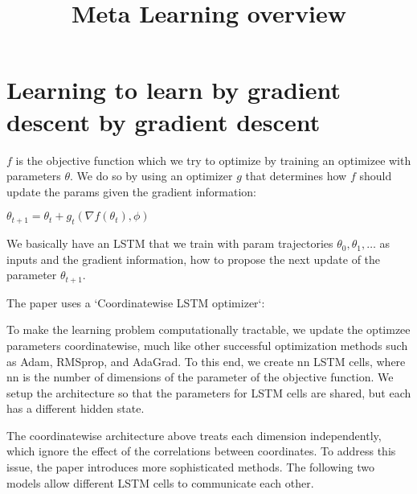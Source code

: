 \documentclass{article}
\begin{document}
\title{Meta Learning overview}
\maketitle
\tableofcontents


\section{Learning to learn by gradient descent by gradient descent}
$f$ is the objective function which we try to optimize by training an optimizee with parameters $\theta$. We do so by using an optimizer $g$ that determines how $f$ should update the params given the gradient information:

$\theta_{t+1} = \theta_{t} + g_{t}(\nabla f(\theta_{t}), \phi)$

We basically have an LSTM that we train with param trajectories $\theta_{0}, \theta_{1}, \ldots$ as inputs and the gradient information, how to propose the next update of the parameter $\theta_{t+1}$.

The paper uses a `Coordinatewise LSTM optimizer`:


To make the learning problem computationally tractable, we update the optimzee parameters coordinatewise, much like other successful optimization methods such as Adam, RMSprop, and AdaGrad.
To this end, we create nn LSTM cells, where nn is the number of dimensions of the parameter of the objective function. We setup the architecture so that the parameters for LSTM cells are shared, but each has a different hidden state.

The coordinatewise architecture above treats each dimension independently, which ignore the effect of the correlations between coordinates. To address this issue, the paper introduces more sophisticated methods. The following two models allow different LSTM cells to communicate each other.
\end{document}

